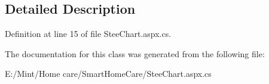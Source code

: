 \subsection{Detailed Description}


Definition at line 15 of file Stee\-Chart.\-aspx.\-cs.



The documentation for this class was generated from the following file\-:\begin{DoxyCompactItemize}
\item 
E\-:/\-Mint/\-Home care/\-Smart\-Home\-Care/Stee\-Chart.\-aspx.\-cs\end{DoxyCompactItemize}
